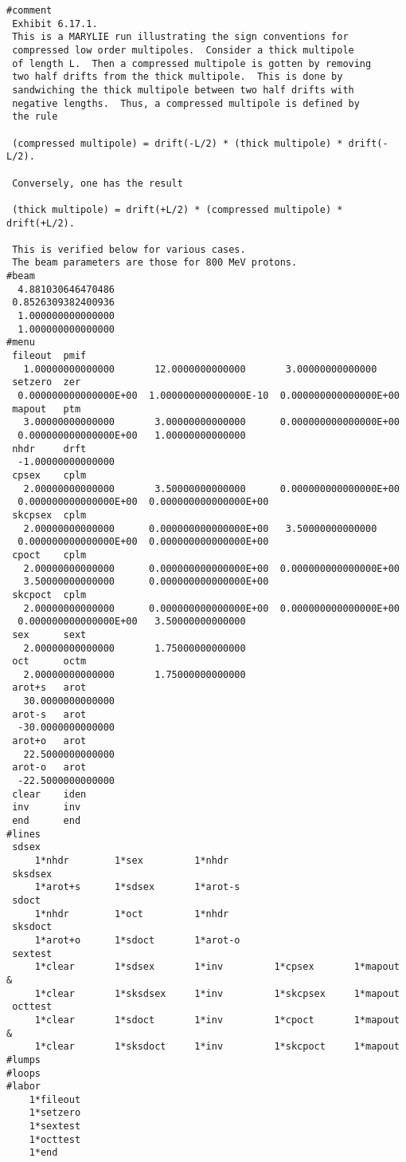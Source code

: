 \newpage
\begin{footnotesize}
\begin{verbatim}
#comment
 Exhibit 6.17.1.
 This is a MARYLIE run illustrating the sign conventions for
 compressed low order multipoles.  Consider a thick multipole
 of length L.  Then a compressed multipole is gotten by removing
 two half drifts from the thick multipole.  This is done by
 sandwiching the thick multipole between two half drifts with
 negative lengths.  Thus, a compressed multipole is defined by
 the rule

 (compressed multipole) = drift(-L/2) * (thick multipole) * drift(-L/2).

 Conversely, one has the result

 (thick multipole) = drift(+L/2) * (compressed multipole) * drift(+L/2).

 This is verified below for various cases.
 The beam parameters are those for 800 MeV protons.
#beam
  4.881030646470486
 0.8526309382400936
  1.000000000000000
  1.000000000000000
#menu
 fileout  pmif
   1.00000000000000       12.0000000000000       3.00000000000000
 setzero  zer
  0.000000000000000E+00  1.000000000000000E-10  0.000000000000000E+00
 mapout   ptm
   3.00000000000000       3.00000000000000      0.000000000000000E+00
  0.000000000000000E+00   1.00000000000000
 nhdr     drft
  -1.00000000000000
 cpsex    cplm
   2.00000000000000       3.50000000000000      0.000000000000000E+00
  0.000000000000000E+00  0.000000000000000E+00
 skcpsex  cplm
   2.00000000000000      0.000000000000000E+00   3.50000000000000
  0.000000000000000E+00  0.000000000000000E+00
 cpoct    cplm
   2.00000000000000      0.000000000000000E+00  0.000000000000000E+00
   3.50000000000000      0.000000000000000E+00
 skcpoct  cplm
   2.00000000000000      0.000000000000000E+00  0.000000000000000E+00
  0.000000000000000E+00   3.50000000000000
 sex      sext
   2.00000000000000       1.75000000000000
 oct      octm
   2.00000000000000       1.75000000000000
 arot+s   arot
   30.0000000000000
 arot-s   arot
  -30.0000000000000
 arot+o   arot
   22.5000000000000
 arot-o   arot
  -22.5000000000000
 clear    iden
 inv      inv
 end      end
#lines
 sdsex
     1*nhdr        1*sex         1*nhdr
 sksdsex
     1*arot+s      1*sdsex       1*arot-s
 sdoct
     1*nhdr        1*oct         1*nhdr
 sksdoct
     1*arot+o      1*sdoct       1*arot-o
 sextest
     1*clear       1*sdsex       1*inv         1*cpsex       1*mapout   &
     1*clear       1*sksdsex     1*inv         1*skcpsex     1*mapout
 octtest
     1*clear       1*sdoct       1*inv         1*cpoct       1*mapout   &
     1*clear       1*sksdoct     1*inv         1*skcpoct     1*mapout
#lumps
#loops
#labor
    1*fileout
    1*setzero
    1*sextest
    1*octtest
    1*end
\end{verbatim}
\end{footnotesize}
